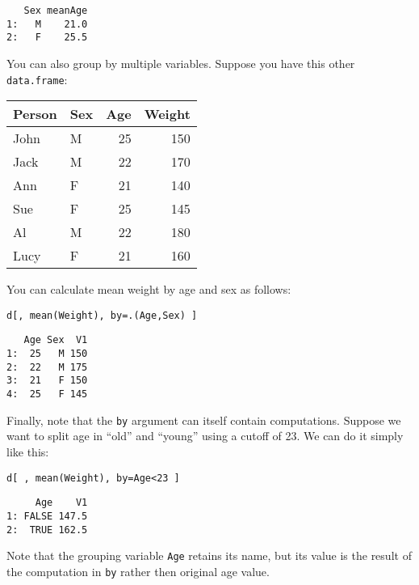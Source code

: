 \documentclass[11pt]{article}
\begin{document}
\begin{verbatim}
   Sex meanAge
1:   M    21.0
2:   F    25.5
\end{verbatim}

You can also group by multiple variables. Suppose you have this other \verb~data.frame~:

\begin{center}
\begin{tabular}{llrr}
Person & Sex & Age & Weight\\
\hline
John & M & 25 & 150\\
Jack & M & 22 & 170\\
Ann & F & 21 & 140\\
Sue & F & 25 & 145\\
Al & M & 22 & 180\\
Lucy & F & 21 & 160\\
\end{tabular}
\end{center}

You can calculate mean weight by age and sex as follows:
\lstset{language=R,label= ,caption= ,numbers=none}
\begin{lstlisting}
d[, mean(Weight), by=.(Age,Sex) ]
\end{lstlisting}

\begin{verbatim}
   Age Sex  V1
1:  25   M 150
2:  22   M 175
3:  21   F 150
4:  25   F 145
\end{verbatim}

Finally, note that the \verb~by~ argument can itself contain
computations. Suppose we want to split age in ``old'' and ``young'' using
a cutoff of 23. We can do it simply like this:
\lstset{language=R,label= ,caption= ,numbers=none}
\begin{lstlisting}
d[ , mean(Weight), by=Age<23 ]
\end{lstlisting}

\begin{verbatim}
     Age    V1
1: FALSE 147.5
2:  TRUE 162.5
\end{verbatim}

Note that the grouping variable \verb~Age~ retains its name, but its value
is the result of the computation in \verb~by~ rather then original age
value.
\end{document}

